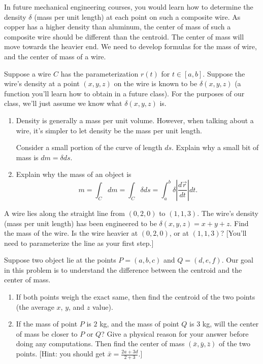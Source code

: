  In future mechanical engineering courses, you would learn how to determine the density $\delta$ (mass per unit length) at each point on such a composite wire.  As copper has a higher density than aluminum, the center of mass of such a composite wire should be different than the centroid. The center of mass will move towards the heavier end. We need to develop formulas for the mass of wire, and the center of mass of a wire.

\begin{problem}[Mass]\label{mass of curve}%
%
 Suppose a wire $C$ has the parameterization $r(t)$ for $t\in[a,b]$.  Suppose the wire's density at a point $(x,y,z)$ on the wire is known to be $\delta(x,y,z)$ (a function you'll learn how to obtain in a future class). For the purposes of our class, we'll just assume we know what $\delta(x,y,z)$ is.   
 \begin{enumerate}
  \item Density is generally a mass per unit volume.  However, when talking about a wire, it's simpler to let density be the mass per unit length.  

  Consider a small portion of the curve of length $ds$.  Explain why a small bit of mass is $dm=\delta ds$.
  \item Explain why the mass of an object is $$m=\int_C dm = \int_C \delta ds = \int_a^b \delta \left|\frac{d\vec r}{dt}\right|dt.$$
 \end{enumerate}
\end{problem}


\begin{problem}
 A wire lies along the straight line from $(0,2,0)$ to $(1,1,3)$.  The wire's density (mass per unit length) has been engineered to be $\delta(x,y,z)=x+y+z$.  Find the mass of the wire. Is the wire heavier at $(0,2,0)$, or at $(1,1,3)$? [You'll need to parameterize the line as your first step.]
\end{problem}



\begin{problem}
 Suppose two object lie at the points $P=(a,b,c)$ and $Q=(d,e,f)$. Our goal in this problem is to understand the difference between the centroid and the center of mass.
\begin{enumerate}
 \item If both points weigh the exact same, then find the centroid of the two points (the average $x$, $y$, and $z$ value).
 \item If the mass of point $P$ is $2$ kg, and the mass of point $Q$ is 3 kg, will the center of mass be closer to $P$ or $Q$? Give a physical reason for your answer before doing any computations.  Then find the center of mass $(\bar x, \bar y, \bar z)$ of the two points. [Hint: you should get $\bar x= \frac{2a+3d}{2+3}$.] 
\end{enumerate}

\end{problem}



